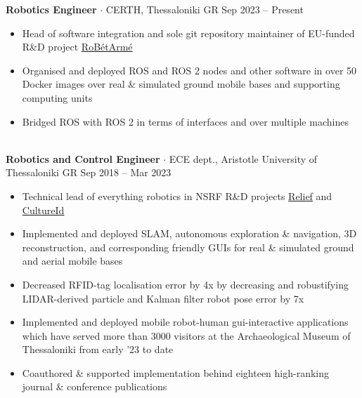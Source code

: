 \documentclass[a4paper,10pt,twoside]{article}
\begin{document}
  \noindent\textbf{Robotics Engineer} $\cdot$ CERTH, Thessaloniki GR \hfill Sep 2023 -- Present \\
  \begin{minipage}[t]{\textwidth}
    \begin{itemize}
      \item Head of software integration and sole git repository maintainer of EU-funded R\&D project \href{https://www.robetarme-project.eu/}{RoBétArmé}\vspace{-0.8em}
      \item Organised and deployed ROS and ROS 2 nodes and other software in over 50 Docker images over real \& simulated ground mobile bases and supporting computing units\vspace{-0.8em}
      \item Bridged ROS with ROS 2 in terms of interfaces and over multiple machines
    \end{itemize}
  \end{minipage} \\[0.4em]

  \noindent\textbf{Robotics and Control Engineer} $\cdot$ ECE dept., Aristotle University of Thessaloniki GR \hfill Sep 2018 -- Mar 2023 \\
  \begin{minipage}[t]{\textwidth}
    \begin{itemize}
      \item Technical lead of everything robotics in NSRF R\&D projects \href{https://relief.web.auth.gr/language/en/home/}{Relief} and \href{https://cultureid.web.auth.gr/?page\_id=200&lang=en}{CultureId} \vspace{-0.8em}
      \item Implemented and deployed SLAM, autonomous exploration \& navigation, 3D reconstruction, and corresponding friendly GUIs for real \& simulated ground and aerial mobile bases\vspace{-0.8em}
      \item Decreased RFID-tag localisation error by 4x by decreasing and robustifying LIDAR-derived particle and Kalman filter robot pose error by 7x \vspace{-0.8em}
      \item Implemented and deployed mobile robot-human gui-interactive applications which have served more than 3000 visitors at the Archaeological Museum of Thessaloniki from early '23 to date \vspace{-0.8em}
      \item Coauthored \& supported implementation behind eighteen high-ranking journal \& conference publications
    \end{itemize}
  \end{minipage} \\[0.4em]
\end{document}
